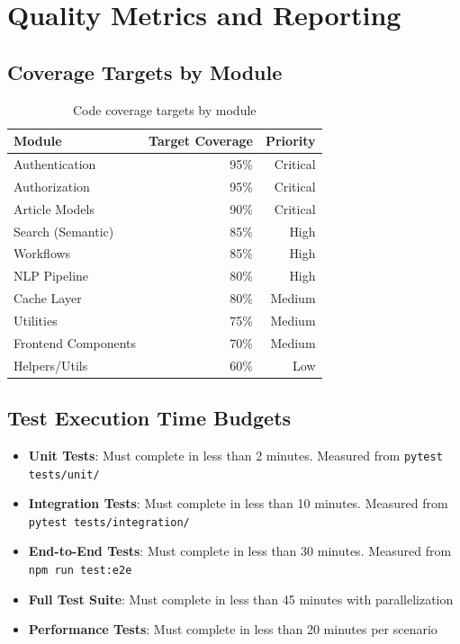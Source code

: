 \documentclass{report}
\begin{document}
\chapter{Quality Metrics and Reporting}

\section{Coverage Targets by Module}

\begin{table}[h]
\centering
\begin{tabular}{|l|r|r|}
\hline
\textbf{Module} & \textbf{Target Coverage} & \textbf{Priority} \\
\hline
Authentication & 95\% & Critical \\
\hline
Authorization & 95\% & Critical \\
\hline
Article Models & 90\% & Critical \\
\hline
Search (Semantic) & 85\% & High \\
\hline
Workflows & 85\% & High \\
\hline
NLP Pipeline & 80\% & High \\
\hline
Cache Layer & 80\% & Medium \\
\hline
Utilities & 75\% & Medium \\
\hline
Frontend Components & 70\% & Medium \\
\hline
Helpers/Utils & 60\% & Low \\
\hline
\end{tabular}
\caption{Code coverage targets by module}
\end{table}

\section{Test Execution Time Budgets}

\begin{itemize}
  \item \textbf{Unit Tests}: Must complete in less than 2 minutes. Measured from \texttt{pytest tests/unit/}
  \item \textbf{Integration Tests}: Must complete in less than 10 minutes. Measured from \texttt{pytest tests/integration/}
  \item \textbf{End-to-End Tests}: Must complete in less than 30 minutes. Measured from \texttt{npm run test:e2e}
  \item \textbf{Full Test Suite}: Must complete in less than 45 minutes with parallelization
  \item \textbf{Performance Tests}: Must complete in less than 20 minutes per scenario
\end{itemize}
\end{document}
